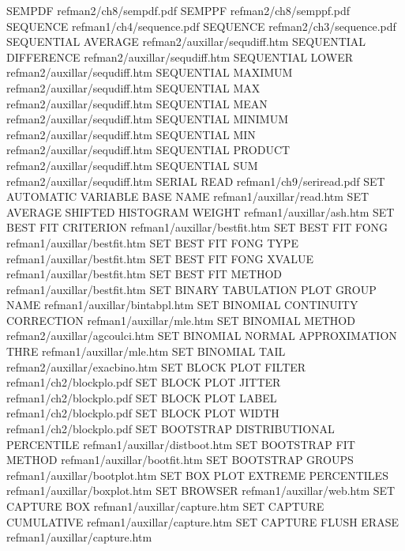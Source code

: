 SEMPDF                                  refman2/ch8/sempdf.pdf
SEMPPF                                  refman2/ch8/semppf.pdf
SEQUENCE                                refman1/ch4/sequence.pdf
SEQUENCE                                refman2/ch3/sequence.pdf
SEQUENTIAL AVERAGE                      refman2/auxillar/sequdiff.htm
SEQUENTIAL DIFFERENCE                   refman2/auxillar/sequdiff.htm
SEQUENTIAL LOWER                        refman2/auxillar/sequdiff.htm
SEQUENTIAL MAXIMUM                      refman2/auxillar/sequdiff.htm
SEQUENTIAL MAX                          refman2/auxillar/sequdiff.htm
SEQUENTIAL MEAN                         refman2/auxillar/sequdiff.htm
SEQUENTIAL MINIMUM                      refman2/auxillar/sequdiff.htm
SEQUENTIAL MIN                          refman2/auxillar/sequdiff.htm
SEQUENTIAL PRODUCT                      refman2/auxillar/sequdiff.htm
SEQUENTIAL SUM                          refman2/auxillar/sequdiff.htm
SERIAL READ                             refman1/ch9/seriread.pdf
SET AUTOMATIC VARIABLE BASE NAME        refman1/auxillar/read.htm
SET AVERAGE SHIFTED HISTOGRAM WEIGHT    refman1/auxillar/ash.htm
SET BEST FIT CRITERION                  refman1/auxillar/bestfit.htm
SET BEST FIT FONG                       refman1/auxillar/bestfit.htm
SET BEST FIT FONG TYPE                  refman1/auxillar/bestfit.htm
SET BEST FIT FONG XVALUE                refman1/auxillar/bestfit.htm
SET BEST FIT METHOD                     refman1/auxillar/bestfit.htm
SET BINARY TABULATION PLOT GROUP NAME   refman1/auxillar/bintabpl.htm
SET BINOMIAL CONTINUITY CORRECTION      refman1/auxillar/mle.htm
SET BINOMIAL METHOD                     refman2/auxillar/agcoulci.htm
SET BINOMIAL NORMAL APPROXIMATION THRE  refman1/auxillar/mle.htm
SET BINOMIAL TAIL                       refman2/auxillar/exacbino.htm
SET BLOCK PLOT FILTER                   refman1/ch2/blockplo.pdf
SET BLOCK PLOT JITTER                   refman1/ch2/blockplo.pdf
SET BLOCK PLOT LABEL                    refman1/ch2/blockplo.pdf
SET BLOCK PLOT WIDTH                    refman1/ch2/blockplo.pdf
SET BOOTSTRAP DISTRIBUTIONAL PERCENTILE refman1/auxillar/distboot.htm
SET BOOTSTRAP FIT METHOD                refman1/auxillar/bootfit.htm
SET BOOTSTRAP GROUPS                    refman1/auxillar/bootplot.htm
SET BOX PLOT EXTREME PERCENTILES        refman1/auxillar/boxplot.htm
SET BROWSER                             refman1/auxillar/web.htm
SET CAPTURE BOX                         refman1/auxillar/capture.htm
SET CAPTURE CUMULATIVE                  refman1/auxillar/capture.htm
SET CAPTURE FLUSH ERASE                 refman1/auxillar/capture.htm

